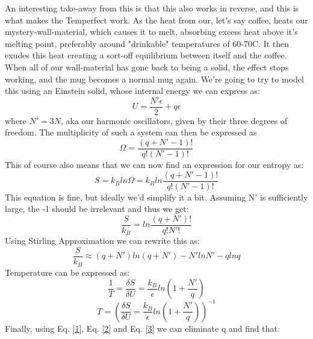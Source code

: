 \documentclass{article}
\begin{document}
\newline
An interesting take-away from this is that this also works in reverse, and this is what makes the Temperfect work. As the heat from our, let's say coffee, heats our mystery-wall-material, which causes it to melt, absorbing excess heat above it's melting point, preferably around "drinkable" temperatures of 60-70\degree C. It then exudes this heat creating a sort-off equilibrium between itself and the coffee. When all of our wall-material has gone back to being a solid, the effect stops working, and the mug becomes a normal mug again.
\newpage
We're going to try to model this using an Einstein solid, whose internal energy we can express as:
\begin{equation} \label{1}
    U= \frac{N'\epsilon}{2}+q\epsilon
\end{equation}
\newline
where $N'=3N$, aka our harmonic oscillators, given by their three degrees of freedom. \newline
The multiplicity of such a system can then be expressed as
\begin{equation} \label{4}
    \Omega = \frac{(q+N'-1)!}{q!(N'-1)!}
\end{equation}
\newline
This of course also means that we can now find an expression for our entropy as:
\begin{equation*}
    S = k_B ln \Omega = k_B ln \frac{(q+N'-1)!}{q!(N'-1)!}
\end{equation*}
\newline
This equation is fine, but ideally we'd simplify it a bit. Assuming N' is sufficiently large, the -1 should be irrelevant and thus we get:
\begin{equation*}
    \frac{S}{k_B} = ln \frac{(q+N')!}{q!N'!}
\end{equation*}
Using Stirling Approximation we can rewrite this as:
\begin{equation} \label{2}
     \frac{S}{k_B} \approx (q+N')ln(q+N')-N' ln N'-q ln q
\end{equation}
Temperature can be expressed as:
\begin{equation*} 
    \frac{1}{T} = \frac{\delta S}{\delta U} = \frac{k_B}{\epsilon} ln(1+\frac{N'}{q})
\end{equation*}
\begin{equation}\label{3}
    T = (\frac{\delta S}{\delta U} = \frac{k_B}{\epsilon} ln(1+\frac{N'}{q}))^{-1}
\end{equation}
Finally, using Eq. \ref{1}, Eq. \ref{2} and Eq. \ref{3} we can eliminate q and find that:
\end{document}
